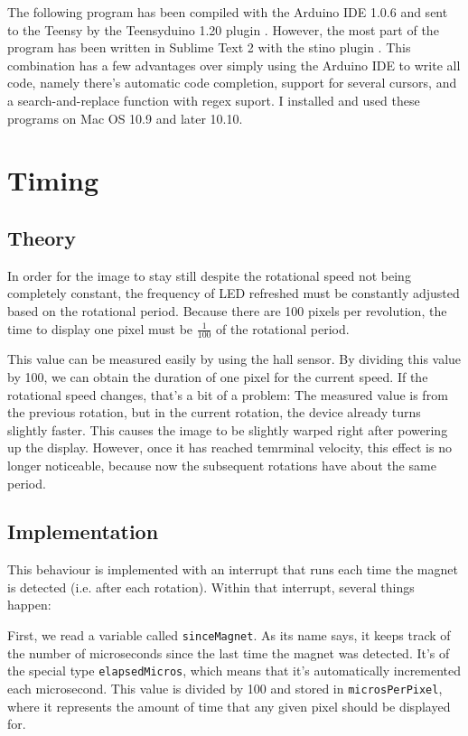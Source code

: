 \documentclass[a4paper, 11pt, titlepage]{report}
\begin{document}
The following program has been compiled with the Arduino IDE 1.0.6 \cite{arduino} and sent to the
Teensy by the Teensyduino 1.20 plugin \cite{teensyduino}. However, the most part of the program
has been written in Sublime Text 2 \cite{sublime} with the stino plugin \cite{stino}. This
combination has a few advantages over simply using the Arduino IDE to write all code, namely
there's automatic code completion, support for several cursors, and a search-and-replace function
with regex suport. I installed and used these programs on Mac OS 10.9 and later 10.10.

\section{Timing}

\subsection{Theory}

In order for the image to stay still despite the rotational speed not being completely constant,
the frequency of LED refreshed must be constantly adjusted based on the rotational period. Because
there are 100 pixels per revolution, the time to display one pixel must be $\frac{1}{100}$ of the
rotational period.

This value can be measured easily by using the hall sensor. By dividing this value by 100, we can
obtain the duration of one pixel for the current speed. If the rotational speed changes, that's a
bit of a problem: The measured value is from the previous rotation, but in the current rotation,
the device already turns slightly faster. This causes the image to be slightly warped right after
powering up the display. However, once it has reached temrminal velocity, this effect is no longer
noticeable, because now the subsequent rotations have about the same period.

\subsection{Implementation}

This behaviour is implemented with an interrupt that runs each time the magnet is detected (i.e.
after each rotation). Within that interrupt, several things happen:

First, we read a variable called \texttt{sinceMagnet}. As its name says, it keeps track of
the number of microseconds since the last time the magnet was detected. It's of the special type
\texttt{elapsedMicros}, which means that it's automatically incremented each microsecond. This
value is divided by 100 and stored in \texttt{microsPerPixel}, where it represents the amount of
time that any given pixel should be displayed for.
\end{document}
